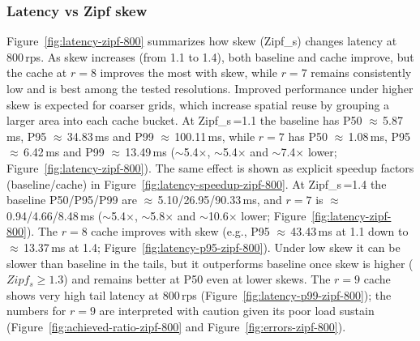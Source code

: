 \subsubsection{Latency vs Zipf skew}
Figure~\ref{fig:latency-zipf-800} summarizes how skew (Zipf\_s) changes latency at 800\,\ac{rps}. As skew increases (from 1.1 to 1.4), both baseline and cache improve, but the cache at $r{=}8$ improves the most with skew, while $r{=}7$ remains consistently low and is best among the tested resolutions. Improved performance under higher skew is expected for coarser grids, which increase spatial reuse by grouping a larger area into each cache bucket. At Zipf\_s\,{=}1.1 the baseline has P50 $\approx$\,5.87\,ms, P95 $\approx$\,34.83\,ms and P99 $\approx$\,100.11\,ms, while $r{=}7$ has P50 $\approx$\,1.08\,ms, P95 $\approx$\,6.42\,ms and P99 $\approx$\,13.49\,ms ($\sim$5.4$\times$, $\sim$5.4$\times$ and $\sim$7.4$\times$ lower; Figure~\ref{fig:latency-zipf-800}). The same effect is shown as explicit speedup factors (baseline/cache) in Figure~\ref{fig:latency-speedup-zipf-800}. At Zipf\_s\,{=}1.4 the baseline P50/P95/P99 are $\approx$\,5.10/26.95/90.33\,ms, and $r{=}7$ is $\approx$\,0.94/4.66/8.48\,ms ($\sim$5.4$\times$, $\sim$5.8$\times$ and $\sim$10.6$\times$ lower; Figure~\ref{fig:latency-zipf-800}). The $r{=}8$ cache improves with skew (e.g., P95 $\approx$\,43.43\,ms at 1.1 down to $\approx$\,13.37\,ms at 1.4; Figure~\ref{fig:latency-p95-zipf-800}). Under low skew it can be slower than baseline in the tails, but it outperforms baseline once skew is higher ($Zipf_s \ge 1.3$) and remains better at P50 even at lower skews. The $r{=}9$ cache shows very high tail latency at 800\,\ac{rps} (Figure~\ref{fig:latency-p99-zipf-800}); the numbers for $r{=}9$ are interpreted with caution given its poor load sustain (Figure~\ref{fig:achieved-ratio-zipf-800} and Figure~\ref{fig:errors-zipf-800}). 


